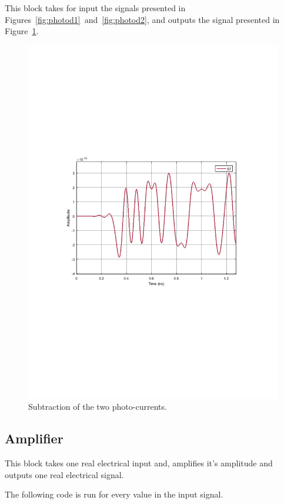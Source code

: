 \documentclass{article}
\begin{document}
This block takes for input the signals presented in Figures~\ref{fig:photod1}~and~\ref{fig:photod2}, and outputs the signal presented in Figure~\ref{fig:subract}.

\begin{figure}[H]
\centering
\includegraphics[width=\linewidth, trim= 0mm 100mm 0mm 100mm, clip]{subtracted.pdf}
\caption{Subtraction of the two photo-currents.}
\label{fig:subract}
\end{figure}

\subsection{Amplifier}

This block takes one real electrical input and, amplifies it's amplitude and outputs one real electrical signal.
\par
The following code is run for every value in the input signal.
\end{document}
